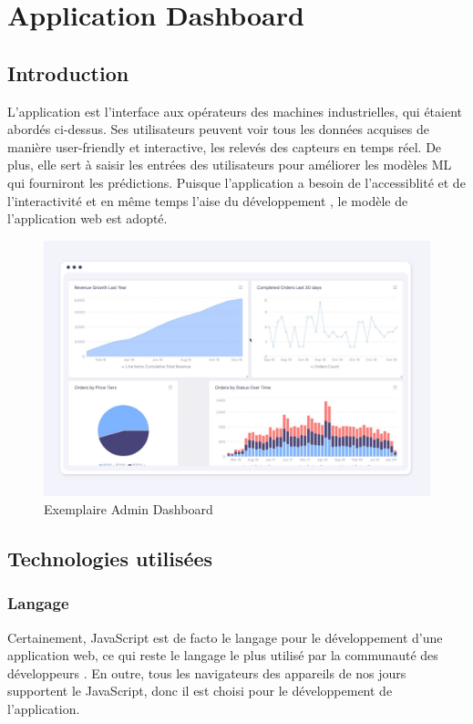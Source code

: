 \documentclass{template}
\begin{document}
\section{Application Dashboard}
\subsection{Introduction}
L'application est l'interface aux opérateurs des machines industrielles, qui étaient abordés ci-dessus. Ses utilisateurs peuvent voir tous les données acquises de manière user-friendly et interactive, les relevés des capteurs en temps réel. De plus, elle sert à saisir les entrées des utilisateurs pour améliorer les modèles ML qui fourniront les prédictions. Puisque l'application a besoin de l'accessiblité et de l'interactivité et en même temps l'aise du développement \cite{trioDevelopment2023}, le modèle de l'application web est adopté. 
\begin{figure}[h!]
    \includegraphics[scale=0.18]{Pics/react-dashboard-guide-2.jpg}
    \centering
    \caption{Exemplaire Admin Dashboard \cite{madewithreactjsReactDashboard}}
\end{figure}
\subsection{Technologies utilisées}
\subsubsection{Langage}
Certainement, JavaScript est de facto le langage pour le développement d'une application web, ce qui reste le langage le plus utilisé par la communauté des développeurs \cite{stackoverflowStackOverflow}. En outre, tous les navigateurs des appareils de nos jours supportent le JavaScript, donc il est choisi pour le développement de l'application. 
\end{document}
